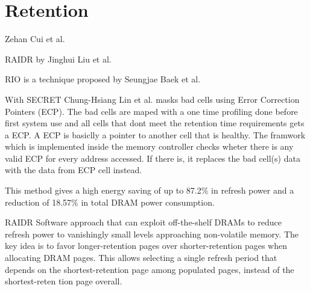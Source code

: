 \section{Retention}
\label{sec:ret}

Zehan Cui et al. \cite{dtail}

RAIDR  by Jinghui Liu et al. \cite{raidr}
  
RIO is a technique proposed by Seungjae Baek et al. \cite{rioparis}

With SECRET Chung-Hsiang Lin et al. \cite{secret} masks bad cells using Error Correction Pointers (ECP). The bad cells are maped with a one time profiling done before first system use and all cells that dont meet the retention time requirements gets a ECP. A ECP is basiclly a pointer to another cell that is healthy. The framwork which is implemented inside the memory controller checks wheter there is any valid ECP for every address accessed. If there is, it replaces the bad cell(s) data with the data from ECP cell instead.

This method gives a high energy saving of up to 87.2\% in refresh power and a reduction of 18.57\% in total DRAM power consumption. 



RAIDR
Software approach that can exploit off-the-shelf DRAMs to reduce refresh power to vanishingly
small levels approaching non-volatile memory. The key idea is to favor longer-retention pages over shorter-retention pages when allocating DRAM pages. This allows selecting a single refresh period that depends on the shortest-retention page among populated pages,
instead of the shortest-reten tion page overall. 



